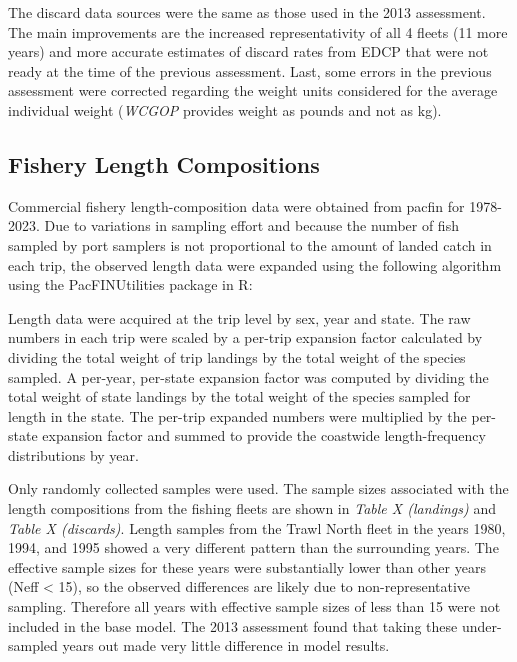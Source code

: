 \documentclass[11pt,
  english,
  letterpaper,
]{article}
\begin{document}
The discard data sources were the same as those used in the 2013 assessment. The main improvements are the increased representativity of all 4 fleets (11 more years) and more accurate estimates of discard rates from EDCP that were not ready at the time of the previous assessment. Last, some errors in the previous assessment were corrected regarding the weight units considered for the average individual weight (\emph{WCGOP} provides weight as pounds and not as kg).

\hypertarget{fishery-length-compositions}{%
\subsection{Fishery Length Compositions}\label{fishery-length-compositions}}

Commercial fishery length-composition data were obtained from \gls{pacfin} for 1978-2023. Due to variations in sampling effort and because the number of fish sampled by port samplers is not proportional to the amount of landed catch in each trip, the observed length data were expanded using the following algorithm using the PacFINUtilities package in R:

Length data were acquired at the trip level by sex, year and state. The raw numbers in each trip were scaled by a per-trip expansion factor calculated by dividing the total weight of trip landings by the total weight of the species sampled. A per-year, per-state expansion factor was computed by dividing the total weight of state landings by the total weight of the species sampled for length in the state. The per-trip expanded numbers were multiplied by the per-state expansion factor and summed to provide the coastwide length-frequency distributions by year.

Only randomly collected samples were used. The sample sizes associated with the length compositions from the fishing fleets are shown in \emph{\emph{Table X (landings)}} and \emph{\emph{Table X (discards)}}. Length samples from the Trawl North fleet in the years 1980, 1994, and 1995 showed a very different pattern than the surrounding years. The effective sample sizes for these years were substantially lower than other years (Neff \textless{} 15), so the observed differences are likely due to non-representative sampling. Therefore all years with effective sample sizes of less than 15 were not included in the base model. The 2013 assessment found that taking these under-sampled years out made very little difference in model results.
\end{document}
